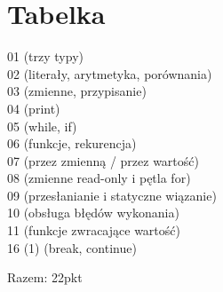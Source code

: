 \documentclass[a4paper]{article}
\begin{document}
\section{Tabelka}
01 (trzy typy) \\
02 (literały, arytmetyka, porównania) \\
03 (zmienne, przypisanie) \\
04 (print) \\
05 (while, if) \\
06 (funkcje, rekurencja) \\
07 (przez zmienną / przez wartość) \\
08 (zmienne read-only i pętla for) \\
09 (przesłanianie i statyczne wiązanie) \\
10 (obsługa błędów wykonania) \\
11 (funkcje zwracające wartość) \\
16 (1) (break, continue)

Razem: 22pkt
\end{document}
